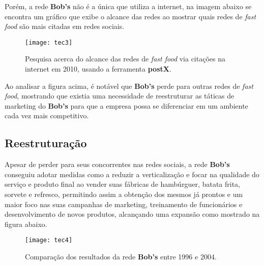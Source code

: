 			Porém, a rede \textbf{Bob’s} não é a única que utiliza a internet, na imagem abaixo se encontra um gráfico que exibe o alcance das redes ao mostrar quais redes de \emph{fast food} são mais citadas em redes sociais. \cite{miti}

			\begin{figure}[h]
				\centering
				\texttt{[image: tec3]}
				\caption[Pesquisa acerca do alcance das redes de fast food via citações na internet em 2010, usando a ferramenta postX]{Pesquisa acerca do alcance das redes de \emph{fast food} via citações na internet em 2010, usando a ferramenta \textbf{postX}. \cite{miti}}
				\label{fig:tec3}
			\end{figure}

			Ao analisar a figura acima, é notável que \textbf{Bob’s} perde para outras redes de \emph{fast food}, mostrando que existia uma necessidade de reestruturar as táticas de marketing do \textbf{Bob’s} para que a empresa possa se diferenciar em um ambiente cada vez mais competitivo. 

		\subsection[Reestruturação]{Reestruturação}
		\label{sec:tecnologias_reestruturação}

			Apesar de perder para seus concorrentes nas redes sociais, a rede \textbf{Bob’s} conseguiu adotar medidas como a reduzir a verticalização e focar na qualidade do serviço e produto final ao vender suas fábricas de hambúrguer, batata frita, sorvete e refresco, permitindo assim a obtenção dos mesmos já prontos e um maior foco nas suas campanhas de marketing, treinamento de funcionários e desenvolvimento de novos produtos, alcançando uma expansão como mostrado na figura abaixo.

			\begin{figure}[h]
				\centering
				\texttt{[image: tec4]}
				\caption[Comparação dos resultados da rede Bob’s entre 1996 e 2004 ]{Comparação dos resultados da rede \textbf{Bob’s} entre 1996 e 2004. \cite{osman}}
				\label{fig:tec4}
			\end{figure}
